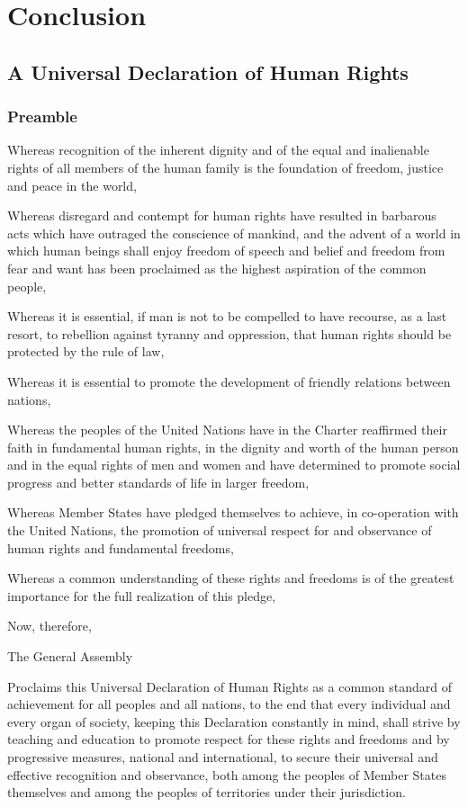 \documentclass[
  titlepage,
  openright,
  DIV=calc,
  toc=listof,
  listof=nochaptergap]{scrbook}
\begin{document}
\chapter{Conclusion}\label{sec:conclusion}

\section{A Universal Declaration of Human
Rights}\label{a-universal-declaration-of-human-rights-4}

\subsection{Preamble}\label{preamble-4}

Whereas recognition of the inherent dignity and of the equal and
inalienable rights of all members of the human family is the foundation
of freedom, justice and peace in the world,

Whereas disregard and contempt for human rights have resulted in
barbarous acts which have outraged the conscience of mankind, and the
advent of a world in which human beings shall enjoy freedom of speech
and belief and freedom from fear and want has been proclaimed as the
highest aspiration of the common people,

Whereas it is essential, if man is not to be compelled to have recourse,
as a last resort, to rebellion against tyranny and oppression, that
human rights should be protected by the rule of law,

Whereas it is essential to promote the development of friendly relations
between nations,

Whereas the peoples of the United Nations have in the Charter reaffirmed
their faith in fundamental human rights, in the dignity and worth of the
human person and in the equal rights of men and women and have
determined to promote social progress and better standards of life in
larger freedom,

Whereas Member States have pledged themselves to achieve, in
co-operation with the United Nations, the promotion of universal respect
for and observance of human rights and fundamental freedoms,

Whereas a common understanding of these rights and freedoms is of the
greatest importance for the full realization of this pledge,

Now, therefore,

The General Assembly

Proclaims this Universal Declaration of Human Rights as a common
standard of achievement for all peoples and all nations, to the end that
every individual and every organ of society, keeping this Declaration
constantly in mind, shall strive by teaching and education to promote
respect for these rights and freedoms and by progressive measures,
national and international, to secure their universal and effective
recognition and observance, both among the peoples of Member States
themselves and among the peoples of territories under their
jurisdiction.
\end{document}
